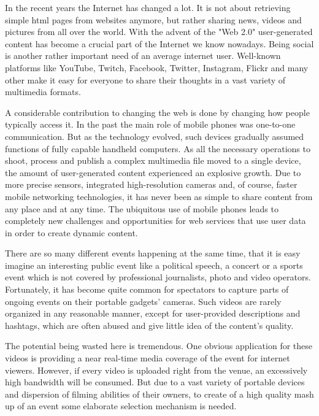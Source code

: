 \documentclass[conference]{IEEEtran}
\begin{document}
In the recent years the Internet has changed a lot. 
It is not about retrieving simple html pages from websites anymore, 
but rather sharing news, videos and pictures from all over the world.
With the advent of the "Web 2.0" user-generated content has become a crucial part of the Internet we know nowadays.
Being social is another rather important need of an average internet user.
Well-known platforms like YouTube, Twitch, Facebook, Twitter, Instagram, Flickr and many other
make it easy for everyone to share their thoughts in a vast variety of multimedia formats.

A considerable contribution to changing the web is done by changing how people typically access it.
In the past the main role of mobile phones was one-to-one communication. 
But as the technology evolved, such devices gradually assumed functions of fully capable handheld computers.
As all the necessary operations to shoot, process and publish a complex multimedia file moved to a single device, 
the amount of user-generated content experienced an explosive growth.
Due to more precise sensors, integrated high-resolution cameras and, of course, faster mobile networking technologies, 
it has never been as simple to share content from any place and at any time.
The ubiquitous use of mobile phones leads to completely new challenges and opportunities for web services 
that use user data in order to create dynamic content.

There are so many different events happening at the same time, 
that it is easy imagine an interesting public event like a political speech, 
a concert or a sports event which is not covered by professional journalists, photo and video operators.
Fortunately, it has become quite common for spectators to capture parts of ongoing events on their portable gadgets' cameras.
Such videos are rarely organized in any reasonable manner, except for user-provided descriptions and hashtags, 
which are often abused and give little idea of the content's quality.

The potential being wasted here is tremendous. 
One obvious application for these videos is providing a near real-time media coverage of the event for internet viewers.
However, if every video is uploaded right from the venue, an excessively high bandwidth will be consumed.
But due to a vast variety of portable devices and dispersion of filming abilities of their owners,
to create of a high quality mash up of an event some elaborate selection mechanism is needed.
\end{document}
